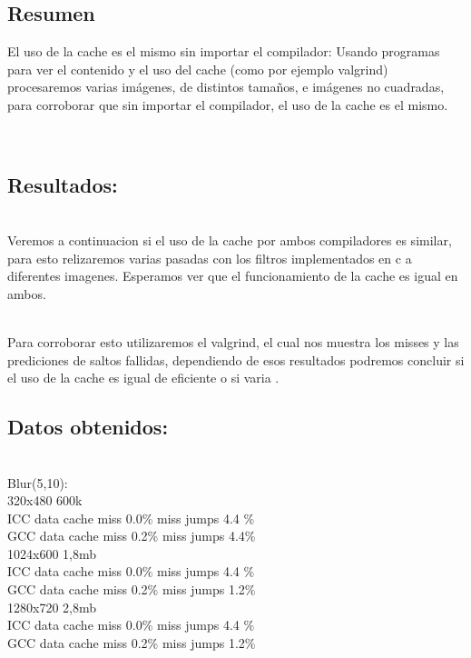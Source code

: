 \subsection{Resumen}

El uso de la cache es el mismo sin importar el compilador: Usando programas para ver el contenido y el uso del cache (como por ejemplo valgrind) procesaremos varias imágenes, de distintos tamaños, e imágenes no cuadradas, para corroborar que sin importar el compilador, el uso de la cache es el mismo.

\\
\subsection{Resultados:}\\

Veremos a continuacion si el uso de la cache por ambos compiladores es similar, para esto relizaremos varias pasadas con los filtros implementados en c a diferentes imagenes. Esperamos ver que el funcionamiento de la cache es igual en ambos. 

\\
Para corroborar esto utilizaremos el valgrind, el cual nos muestra los misses y las  prediciones de saltos fallidas, dependiendo de esos resultados podremos concluir si el uso de la cache es igual de eficiente o si varia .

\subsection{Datos obtenidos:}\\

Blur(5,10): \\

320x480 600k \\
ICC    data cache miss 0.0$\%$ miss jumps  4.4 $\%$  \\
GCC   data cache miss 0.2$\%$ miss jumps   4.4$\%$  \\ 

1024x600 1,8mb \\
ICC    data cache miss 0.0$\%$ miss jumps  4.4 $\%$  \\
GCC   data cache miss 0.2$\%$ miss jumps   1.2$\%$  \\ 

1280x720 2,8mb \\
ICC    data cache miss 0.0$\%$ miss jumps  4.4 $\%$  \\
GCC   data cache miss 0.2$\%$ miss jumps   1.2$\%$  \\ 